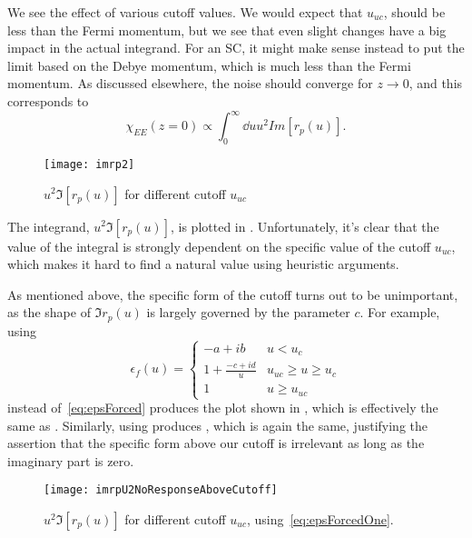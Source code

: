 \documentclass[11pt]{article}
\begin{document}
	We see  the effect of various cutoff values.
	We would expect that $u_{uc}$, should be less than the Fermi momentum, but we see that even slight changes have a big impact in the actual integrand.
	For an SC, it might make sense instead to put the limit based on the Debye momentum, which is much less than the Fermi momentum.
	As discussed elsewhere, the noise should converge for $z \rightarrow 0$, and this corresponds to
	\begin{equation}
		\chi_{EE}(z = 0) \propto \int_0^\infty \dd{u} u^2 Im[r_p(u)].
	\end{equation}

	\begin{figure}[htp]
		\centering
		\texttt{[image: imrp2]}
		\caption{$u^2 \Im[r_p(u)]$ for different cutoff $u_{uc}$} \label{fig:u2imrpVsCutoff}
	\end{figure}
	The integrand, $u^2 \Im[r_p(u)]$, is plotted in .
	Unfortunately, it's clear that the value of the integral is strongly dependent on the specific value of the cutoff $u_{uc}$, which makes it hard to find a natural value using heuristic arguments.

	As mentioned above, the specific form of the cutoff turns out to be unimportant, as the shape of $\Im r_p(u)$ is largely governed by the parameter $c$.
	For example, using
	\begin{equation}
		\epsilon_f(u) =
		\begin{cases}
			-a + i b & u < u_c \\
			1 + \frac{-c + i d}{u} &  u_{uc} \geq u \geq u_c \\
			1                      &  u \geq u_{uc}
		\end{cases} \label{eq:epsForcedOne}
	\end{equation}
	instead of~\eqref{eq:epsForced} produces the plot shown in , which is effectively the same as .
	Similarly, using  produces , which is again the same, justifying the assertion that the specific form above our cutoff is irrelevant as long as the imaginary part is zero.
	\begin{figure}[htp]
		\centering
		\texttt{[image: imrpU2NoResponseAboveCutoff]}
		\caption{$u^2 \Im[r_p(u)]$ for different cutoff $u_{uc}$, using~\eqref{eq:epsForcedOne}.} \label{fig:u2imrpVsCutoffNoResponseAbove}
	\end{figure}
\end{document}
